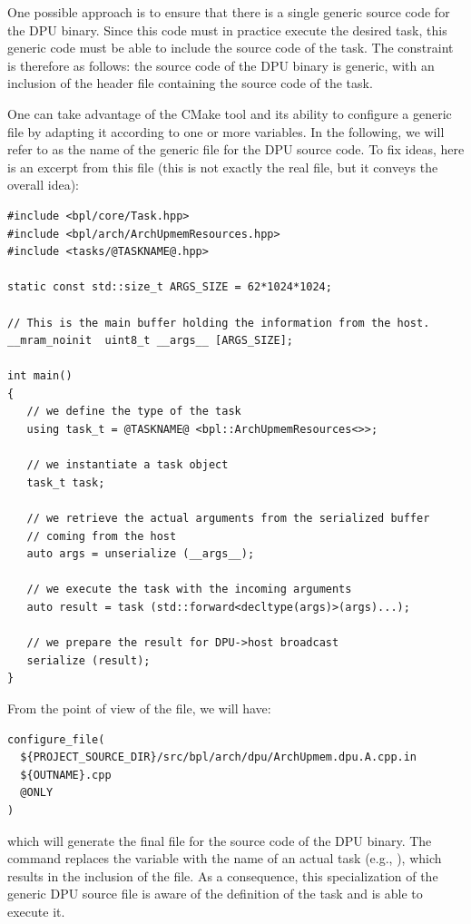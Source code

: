 One possible approach is to ensure that there is a single generic source code for the DPU binary. Since this code must in practice execute the desired task, this generic code must be able to include the source code of the task. The constraint is therefore as follows: the source code of the DPU binary is generic, with an inclusion of the header file containing the source code of the task.

One can take advantage of the CMake tool and its ability to configure a generic file by adapting it according to one or more variables. In the following, we will refer to  as the name of the generic file for the DPU source code. To fix ideas, here is an excerpt from this file (this is not exactly the real file, but it conveys the overall idea):

\begin{verbatim}
#include <bpl/core/Task.hpp>
#include <bpl/arch/ArchUpmemResources.hpp>
#include <tasks/@TASKNAME@.hpp>

static const std::size_t ARGS_SIZE = 62*1024*1024;

// This is the main buffer holding the information from the host.
__mram_noinit  uint8_t __args__ [ARGS_SIZE];

int main() 
{
   // we define the type of the task 
   using task_t = @TASKNAME@ <bpl::ArchUpmemResources<>>;
	
   // we instantiate a task object
   task_t task;

   // we retrieve the actual arguments from the serialized buffer 
   // coming from the host
   auto args = unserialize (__args__);

   // we execute the task with the incoming arguments
   auto result = task (std::forward<decltype(args)>(args)...);	
   
   // we prepare the result for DPU->host broadcast
   serialize (result);
}
\end{verbatim}

From the point of view of the  file, we will have:

\begin{verbatim}
configure_file(
  ${PROJECT_SOURCE_DIR}/src/bpl/arch/dpu/ArchUpmem.dpu.A.cpp.in
  ${OUTNAME}.cpp
  @ONLY
)
\end{verbatim}

which will generate the final  file for the source code of the DPU binary. The  command replaces the  variable with the name of an actual task (e.g., ), which results in the inclusion of the  file. As a consequence, this specialization of the generic DPU source file is aware of the definition of the 
 task and is able to execute it.

